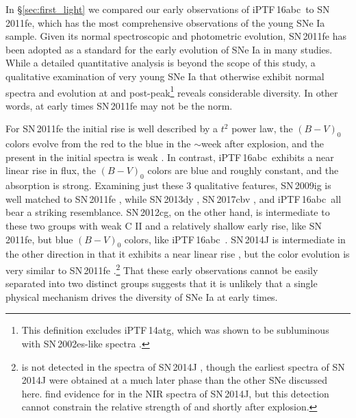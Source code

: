 \documentclass[twocolumn]{aastex61}
\newcommand{\abc}{iPTF\,16abc}
\begin{document}
In \S\ref{sec:first_light} we compared our early observations of \abc\ to SN\,2011fe, which has the most comprehensive observations of the young SNe Ia sample. Given its normal spectroscopic and photometric evolution, SN\,2011fe has been adopted as a standard for the early evolution of SNe Ia in many studies. While a detailed quantitative analysis is beyond the scope of this study, a qualitative examination of very young SNe Ia that otherwise exhibit normal spectra and evolution at and post-peak\footnote{This definition excludes iPTF\,14atg, which was shown to be subluminous with SN\,2002es-like spectra \citep{2015Natur.521..328C}.} reveals considerable diversity. In other words, at early times SN\,2011fe may not be the norm.

For SN\,2011fe the initial rise is well described by a $t^2$ power law, the $(B - V)_0$ colors evolve from the red to the blue in the $\sim$week after explosion, and the  present in the initial spectra is weak \citep{2011Natur.480..344N,2016ApJ...820...67Z,2012ApJ...752L..26P}. In contrast, \abc\ exhibits a near linear rise in flux, the $(B - V)_0$ colors are blue and roughly constant, and the  absorption is strong. Examining just these 3 qualitative features, SN\,2009ig is well matched to SN\,2011fe \citep{2012ApJ...744...38F}, while SN\,2013dy \citep{2013ApJ...778L..15Z}, SN\,2017cbv \citep{2017arXiv170608990H}, and \abc\ all bear a striking resemblance. SN\,2012cg, on the other hand, is intermediate to these two groups with weak C II and a relatively shallow early rise, like SN\,2011fe, but blue $(B - V)_0$ colors, like \abc\ \citep{2012ApJ...756L...7S,2016ApJ...820...92M}. SN\,2014J is intermediate in the other direction in that it exhibits a near linear rise \citep{2014ApJ...783L..24Z,2015ApJ...799..106G}, but the color evolution is very similar to SN\,2011fe \citep{2014ApJ...788L..21A}.\footnote{ is not detected in the spectra of SN\,2014J \citep{2014ApJ...784L..12G,2014ApJ...783L..24Z}, though the earliest spectra of SN\,2014J were obtained at a much later phase than the other SNe discussed here. \citet{2015ApJ...798...39M} find evidence for  in the NIR spectra of SN\,2014J, but this detection cannot constrain the relative strength of  and  shortly after explosion.} That these early observations cannot be easily separated into two distinct groups suggests that it is unlikely that a single physical mechanism drives the diversity of SNe Ia at early times. 
\end{document}
